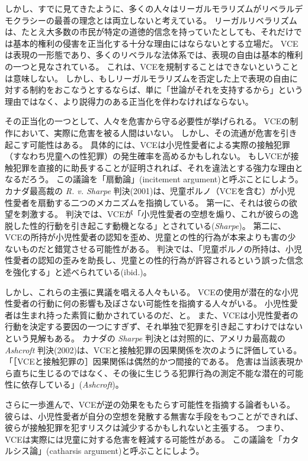\documentclass[paper=a4,book,openany]{jlreq}
\begin{document}
しかし、すでに見てきたように、多くの人々はリーガルモラリズムがリベラルデモクラシーの最善の理念とは両立しないと考えている。
リーガルリベラリズムは、たとえ大多数の市民が特定の道徳的信念を持っていたとしても、それだけでは基本的権利の侵害を正当化する十分な理由にはならないとする立場だ。
VCEは表現の一形態であり、多くのリベラルな法体系では、表現の自由は基本的権利の一つと見なされている。
これは、VCEを規制することはできないということは意味しない。
しかし、もしリーガルモラリズムを否定した上で表現の自由に対する制約をおこなうとするならば、単に「世論がそれを支持するから」という理由ではなく、より説得力のある正当化を伴わなければならない。

その正当化の一つとして、人々を危害から守る必要性が挙げられる。
VCEの制作において、実際に危害を被る人間はいない。
しかし、その流通が危害を引き起こす可能性はある。
具体的には、VCEは小児性愛者による実際の接触犯罪（すなわち児童への性犯罪）の発生確率を高めるかもしれない。
もしVCEが接触犯罪を直接的に助長することが証明されれば、それを違法とする強力な理由となるだろう。
この議論を「扇動論」(incitement argument)と呼ぶことにしよう。
カナダ最高裁の \emph{R. v. Sharpe} 判決(2001)は、児童ポルノ（VCEを含む）が小児性愛者を扇動する二つのメカニズムを指摘している。
第一に、それは彼らの欲望を刺激する。
判決では、VCEが「小児性愛者の空想を煽り、これが彼らの逸脱した性的行動を引き起こす動機となる」とされている(\emph{Sharpe})。
第二に、VCEの所持が小児性愛者の認知を歪め、児童との性的行為が本来よりも害の少ないものだと錯覚させる可能性がある。
判決では、「児童ポルノの所持は、小児性愛者の認知の歪みを助長し、児童との性的行為が許容されるという誤った信念を強化する」と述べられている(ibid.)。

しかし、これらの主張に異議を唱える人々もいる。
VCEの使用が潜在的な小児性愛者の行動に何の影響も及ぼさない可能性を指摘する人々がいる。
小児性愛者は生まれ持った素質に動かされているのだ、と。
また、VCEは小児性愛者の行動を決定する要因の一つにすぎず、それ単独で犯罪を引き起こすわけではないという見解もある。
カナダの \emph{Sharpe} 判決とは対照的に、アメリカ最高裁の \emph{Ashcroft} 判決(2002)は、VCEと接触犯罪の因果関係を次のように評価している。
「［VCEと接触犯罪の］因果関係は偶然的かつ間接的である。
危害は当該表現から直ちに生じるのではなく、その後に生じうる犯罪行為の測定不能な潜在的可能性に依存している」(\emph{Ashcroft})。

さらに一歩進んで、VCEが逆の効果をもたらす可能性を指摘する論者もいる。
彼らは、小児性愛者が自分の空想を発散する無害な手段をもつことができれば、彼らが接触犯罪を犯すリスクは減少するかもしれないと主張する。
つまり、VCEは実際には児童に対する危害を軽減する可能性がある。
この議論を「カタルシス論」(catharsis argument)と呼ぶことにしよう。
\end{document}

